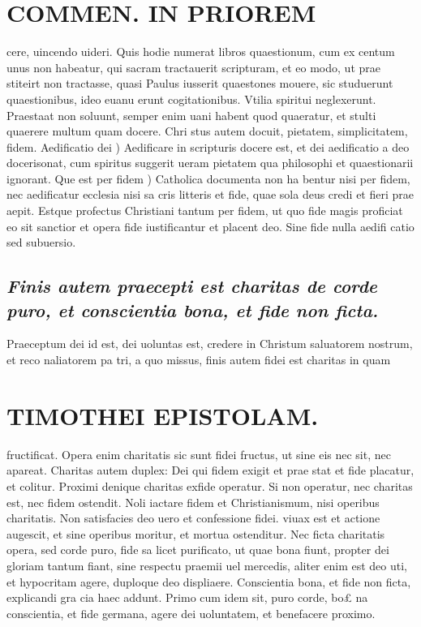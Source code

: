 \documentclass{article}
\begin{document}
\begin{pages}
\section*{COMMEN. IN PRIOREM }
\marginpar{[ p.14 ]}\pstart cere, uincendo uideri. Quis hodie numerat libros quaestionum, cum ex centum unus non habeatur, qui sacram tractauerit scripturam, et eo modo, ut prae stiteirt non tractasse, quasi Paulus iusserit quaestones mouere, sic studuerunt quaestionibus, ideo euanu erunt cogitationibus. Vtilia spiritui neglexerunt. Praestaat non soluunt, semper enim uani habent quod quaeratur, et stulti quaerere multum quam docere. Chri stus autem docuit, pietatem, simplicitatem, fidem. Aedificatio dei ) Aedificare in scripturis docere est, et dei aedificatio a deo docerisonat, cum spiritus suggerit ueram pietatem qua philosophi et quaestionarii ignorant.  \pend\pstart Que est per fidem ) Catholica documenta non ha bentur nisi per fidem, nec aedificatur ecclesia nisi sa cris litteris et fide, quae sola deus credi et fieri prae aepit. Estque profectus Christiani tantum per fidem, ut quo fide magis proficiat eo sit sanctior et opera fide iustificantur et placent deo. Sine fide nulla aedifi catio sed subuersio.  \pend
{}
{}
\subsection*{\textit{Finis autem praecepti est charitas de corde puro, et conscientia bona, et fide non ficta. }}\pstart Praeceptum dei id est, dei uoluntas est, credere in Christum saluatorem nostrum, et reco naliatorem pa tri, a quo missus, finis autem fidei est charitas in quam  \pend
\section*{TIMOTHEI EPISTOLAM. }
\marginpar{[ p.15 ]}\pstart fructificat. Opera enim charitatis sic sunt fidei fructus, ut sine eis nec sit, nec apareat. Charitas autem duplex: Dei qui fidem exigit et prae stat et fide placatur, et colitur. Proximi denique charitas exfide operatur. Si non operatur, nec charitas est, nec fidem ostendit. Noli iactare fidem et Christianismum, nisi operibus charitatis. Non satisfacies deo uero et confessione fidei. viuax est et actione augescit, et sine operibus moritur, et mortua ostenditur.  \pend\pstart Nec ficta charitatis opera, sed corde puro, fide sa licet purificato, ut quae bona fiunt, propter dei gloriam tantum fiant, sine respectu praemii uel mercedis, aliter enim est deo uti, et hypocritam agere, duploque deo displiaere.  \pend\pstart Conscientia bona, et fide non ficta, explicandi gra cia haec addunt. Primo cum idem sit, puro corde, bo£ na conscientia, et fide germana, agere dei uoluntatem, et benefacere proximo.  \pend
{}
{}

\end{pages}
\end{document}
